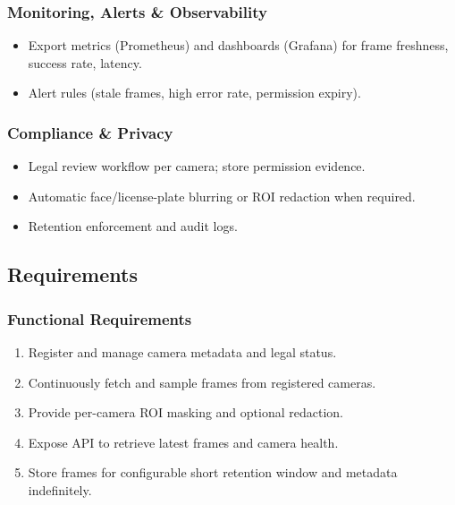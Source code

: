 \subsubsection{Monitoring, Alerts \& Observability}
\begin{itemize}
  \item Export metrics (Prometheus) and dashboards (Grafana) for frame freshness, success rate, latency.
  \item Alert rules (stale frames, high error rate, permission expiry).
\end{itemize}

\subsubsection{Compliance \& Privacy}
\begin{itemize}
  \item Legal review workflow per camera; store permission evidence.
  \item Automatic face/license-plate blurring or ROI redaction when required.
  \item Retention enforcement and audit logs.
\end{itemize}

\subsection{Requirements}
\subsubsection{Functional Requirements}
\begin{enumerate}
  \item Register and manage camera metadata and legal status.
  \item Continuously fetch and sample frames from registered cameras.
  \item Provide per-camera ROI masking and optional redaction.
  \item Expose API to retrieve latest frames and camera health.
  \item Store frames for configurable short retention window and metadata indefinitely.
\end{enumerate}


